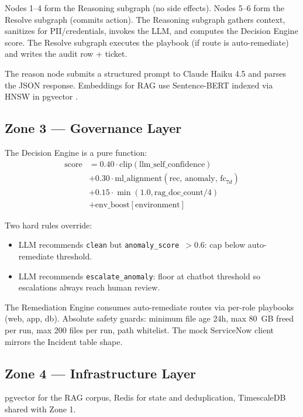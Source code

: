 \documentclass[conference]{IEEEtran}
\begin{document}
Nodes 1--4 form the Reasoning subgraph (no side effects). Nodes 5--6
form the Resolve subgraph (commits action). The Reasoning subgraph
gathers context, sanitizes for PII/credentials, invokes the LLM, and
computes the Decision Engine score. The Resolve subgraph executes
the playbook (if route is auto-remediate) and writes the audit row +
ticket.

The reason node submits a structured prompt to Claude Haiku 4.5
\cite{anthropic2024claude3} and parses the JSON response. Embeddings
for RAG use Sentence-BERT \cite{reimers2019sentencebert} indexed
via HNSW \cite{malkov2020hnsw} in pgvector \cite{pgvector2024}.

\subsection{Zone 3 --- Governance Layer}

The Decision Engine is a pure function:
\begin{align*}
\text{score} &= 0.40 \cdot \text{clip}(\text{llm\_self\_confidence}) \\
&+ 0.30 \cdot \text{ml\_alignment}(\text{rec, anomaly, fc}_{7d}) \\
&+ 0.15 \cdot \min(1.0, \text{rag\_doc\_count}/4) \\
&+ \text{env\_boost}[\text{environment}]
\end{align*}

Two hard rules override:
\begin{itemize}
\item LLM recommends \texttt{clean} but \texttt{anomaly\_score}~$>0.6$:
  cap below auto-remediate threshold.
\item LLM recommends \texttt{escalate\_anomaly}: floor at chatbot
  threshold so escalations always reach human review.
\end{itemize}

The Remediation Engine consumes auto-remediate routes via per-role
playbooks (web, app, db). Absolute safety guards: minimum file age
24h, max 80~GB freed per run, max 200 files per run, path whitelist.
The mock ServiceNow client mirrors the Incident table shape.

\subsection{Zone 4 --- Infrastructure Layer}

pgvector \cite{pgvector2024} for the RAG corpus, Redis for state and
deduplication, TimescaleDB \cite{timescale2024} shared with Zone 1.
\end{document}
